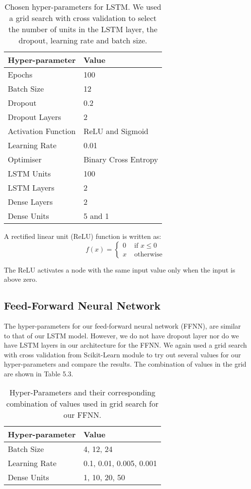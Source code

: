 \begin{table}[h]
\centering
\begin{tabular}{ll}
\hline
Hyper-parameter     &  Value \\
\hline
Epochs     & 100  \\
Batch Size      & 12 \\
Dropout & 0.2 \\
Dropout Layers & 2 \\
Activation Function & ReLU and Sigmoid \\
Learning Rate & 0.01 \\
Optimiser & Binary Cross Entropy \\
LSTM Units & 100\\
LSTM Layers & 2\\
Dense Layers & 2\\
Dense Units & 5 and 1 \\
\hline
\end{tabular}
\caption{Chosen hyper-parameters for LSTM. We used a grid search with cross validation to select the number of units in the LSTM layer, the dropout, learning rate and batch size.}
\end{table}


A rectified linear unit (ReLU) function is written as: 
\begin{equation}
f(x)=\left\{\begin{array}{ll}
0 & \text { if } x \leq 0 \\
x & \text { otherwise }
\end{array}\right.
\end{equation}

The ReLU activates a node with the same input value only when the input is above zero.




\subsection{Feed-Forward Neural Network}

The hyper-parameters for our feed-forward neural network (FFNN), are similar to that of our LSTM model. However, we do not have dropout layer nor do we have LSTM layers in our architecture for the FFNN.  We again used a grid search with cross validation from Scikit-Learn module to try out several values for our hyper-parameters and compare the results. The combination of values in the grid are shown in Table 5.3.

\begin{table}[h]
\centering
\begin{tabular}{ll}
\hline
Hyper-parameter     &  Value \\
\hline
Batch Size      & 4, 12, 24 \\
Learning Rate & 0.1, 0.01, 0.005, 0.001 \\
Dense Units & 1, 10, 20, 50\\
\hline
\end{tabular}
\caption{Hyper-Parameters and their corresponding combination of values used in grid search for our FFNN.}
\end{table}


